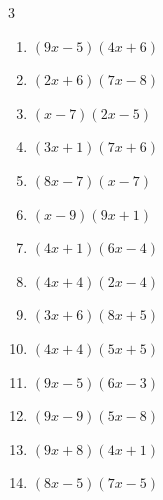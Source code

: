\begin{multicols}{3}
\begin{enumerate}

  \item $(9x-5)(4x+6)$


  \item $(2x+6)(7x-8)$


  \item $(x-7)(2x-5)$


\columnbreak %

\resetques

  \item $(3x+1)(7x+6)$


  \item $(8x-7)(x-7)$


  \item $(x-9)(9x+1)$


  \item $(4x+1)(6x-4)$


  \item $(4x+4)(2x-4)$


  \item $(3x+6)(8x+5)$


  \item $(4x+4)(5x+5)$


  \item $(9x-5)(6x-3)$


  \item $(9x-9)(5x-8)$


  \item $(9x+8)(4x+1)$


  \item $(8x-5)(7x-5)$


\end{enumerate}
\end{multicols}
